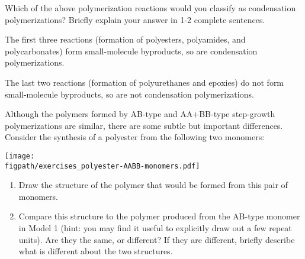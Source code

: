 \begin{activity}
\begin{ctqs}
		\vspace{0.25in}
		\question Which of the above polymerization reactions would you classify as condensation polymerizations?  Briefly explain your answer in 1-2 complete sentences.
			
				\begin{solution}[2in]
					The first three reactions (formation of polyesters, polyamides, and polycarbonates) form small-molecule byproducts, so are condensation polymerizations.
					
					The last two reactions (formation of polyurethanes and epoxies) do not form small-molecule byproducts, so are not condensation polymerizations.
				\end{solution}
			
\end{ctqs}
	

\clearpage
\begin{exercises}

		
		\exercise \label{\labelbase:exc:AABBester} Although the polymers formed by AB-type and AA+BB-type step-growth polymerizations are similar, there are some subtle but important differences.
			Consider the synthesis of a polyester from the following two monomers:
			
			\centerline{\texttt{[image: \\figpath/exercises\_polyester-AABB-monomers.pdf]}}	
			
			\begin{enumerate}
				\item Draw the structure of the polymer that would be formed from this pair of monomers.
					
					\begin{solution}\end{solution}
					
				\item Compare this structure to the polymer produced from the AB-type monomer in Model 1 (hint: you may find it useful to explicitly draw out a few repeat units).  Are they the same, or different?  If they are different, briefly describe what is different about the two structures.
					
					\begin{solution}
\end{solution}
\end{enumerate}
\end{exercises}
\end{activity}
